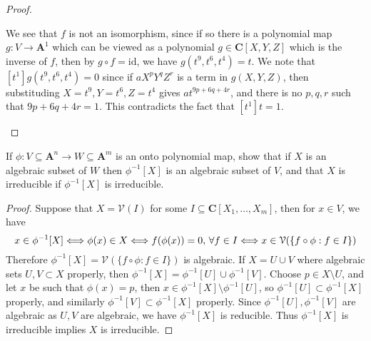 \documentclass[11pt]{book}
\begin{document}
\begin{problem}
\begin{proof}
\begin{enumerate}[label=(\alph*)]
	We see that $f$ is not an isomorphism, since if so there is a polynomial map $g:V\rightarrow\mathbf A^1$ which can be viewed as a polynomial $g\in \mathbf C[X,Y,Z]$ which is the inverse of $f$, then by $g\circ f=\mathrm{id}$, we have $g(t^9,t^6,t^4)=t$. We note that $[t^1]g(t^9,t^6,t^4)=0$ since if $aX^pY^qZ^r$ is a term in $g(X,Y,Z)$, then substituding $X=t^9,Y=t^6,Z=t^4$ gives $at^{9p+6q+4r}$, and there is no $p,q,r$ such that $9p+6q+4r=1$. This contradicts the fact that $[t^1]t=1$.
\end{enumerate}
\end{proof}
\end{problem}
\begin{problem}
If $\phi:V\subseteq\mathbf A^n\rightarrow W \subseteq\mathbf A^m$ is an onto polynomial map, show that if $X$ is an algebraic subset of $W$ then $\phi^{-1}[X]$ is an algebraic subset of $V$, and that $X$ is irreducible if $\phi^{-1}[X]$ is irreducible.
\begin{proof}
Suppose that $X=\mathcal{V}(I)$ for some $I\subseteq \mathbf C[X_1,\dots,X_m]$, then for $x\in V$, we have
\[
x\in \phi^{-1}[X]\Longleftrightarrow \phi(x)\in X\\
\Longleftrightarrow f(\phi(x))=0,\,\forall f\in I\\
\Longleftrightarrow x\in \mathcal{V}(\{f\circ \phi:f\in I\})
\]
Therefore $\phi^{-1}[X]=\mathcal{V}(\{f\circ \phi:f\in I\})$ is algebraic. If $X=U\cup V$ where algebraic sets $U,V\subset X$ properly, then $\phi^{-1}[X]=\phi^{-1}[U]\cup\phi^{-1}[V]$. Choose $p\in X\setminus U$, and let $x$ be such that $\phi(x)=p$, then $x\in \phi^{-1}[X]\setminus \phi^{-1}[U]$, so $\phi^{-1}[U]\subset \phi^{-1}[X]$ properly, and similarly $\phi^{-1}[V]\subset \phi^{-1}[X]$ properly. Since $\phi^{-1}[U],\phi^{-1}[V]$ are algebraic as $U,V$ are algebraic, we have $\phi^{-1}[X]$ is reducible. Thus $\phi^{-1}[X]$ is irreducible implies $X$ is irreducible.
\end{proof}
\end{problem}
\newpage
\end{document}
